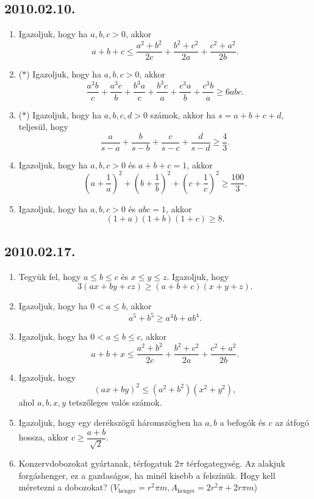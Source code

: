 \documentclass{article}
\begin{document}
\subsection*{2010.02.10.}
\begin{enumerate}
\item Igazoljuk, hogy ha $a,b,c>0$, akkor
$$a+b+c\le \dfrac{a^2+b^2}{2c}+\dfrac{b^2+c^2}{2a}+\dfrac{c^2+a^2}{2b}.$$
\item ($*$) Igazoljuk, hogy ha $a,b,c>0$, akkor
$$\dfrac{a^3b}{c}+\dfrac{a^3c}{b}+\dfrac{b^3a}{c}+\dfrac{b^3c}{a}
+\dfrac{c^3a}{b}+\dfrac{c^3b}{a}\ge 6abc. $$
\item ($*$) Igazoljuk, hogy ha $a,b,c,d>0$ számok, akkor
ha $s=a+b+c+d$, teljesül, hogy
$$\dfrac{a}{s-a}+\dfrac{b}{s-b}+\dfrac{c}{s-c}+\dfrac{d}{s-d}\ge \dfrac{4}{3}.$$
\item Igazoljuk, hogy ha $a,b,c>0$ és $a+b+c=1$, akkor
$$\left(a+\dfrac{1}{a}\right)^2+ 
\left(b+\dfrac{1}{b}\right)^2+
\left(c+\dfrac{1}{c}\right)^2\ge\dfrac{100}{3}.
$$
\item Igazoljuk, hogy ha $a,b,c>0$ és $abc=1$, akkor
$$(1+a)(1+b)(1+c)\ge 8.$$
\end{enumerate}

\subsection*{2010.02.17.}
\begin{enumerate}
\item Tegyük fel, hogy $a\le b \le c$ és $x\le y \le z$. Igazoljuk, hogy 
$$3(ax+by+cz)\ge(a+b+c)(x+y+z).$$
\item Igazoljuk, hogy ha $0<a\le b$, akkor
$$a^5+b^5\ge a^4b+ab^4.$$
\item Igazoljuk, hogy ha $0<a\le b\le c$, akkor
$$a+b+x\le \dfrac{a^2+b^2}{2c}+\dfrac{b^2+c^2}{2a}+\dfrac{c^2+a^2}{2b}.$$
\item Igazoljuk, hogy 
$$(ax+by)^2\le(a^2+b^2)(x^2+y^2),$$
ahol $a,b,x,y$ tetszőleges valós számok.
\item Igazoljuk, hogy egy derékszögű háromszögben ha $a,b$ a befogók és $c$ az átfogó hossza, akkor $c\ge\dfrac{a+b}{\sqrt{2}}$.
\item Konzervdobozokat gyártanak, térfogatuk $2\pi$ térfogategység.
Az alakjuk forgáshenger, ez a gazdaságos, ha minél kisebb a felszínük. Hogy kell méretezni a dobozokat? ($V_{\text{henger}}=r^2\pi m, A_{\text{henger}}=2r^2\pi+2r\pi m$)
\end{enumerate}
\end{document}
